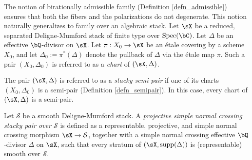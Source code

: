 \documentclass[11pt,letterpaper]{amsart}
\numberwithin{equation}{section}
\begin{document}
    The notion of birationally admissible family (Definition \ref{defn_admissible}) ensures that both the fibers and the polarizations do not degenerate. This notion naturally generalizes to family over an algebraic stack.
    Let $\sX$ be a reduced, separated Deligne-Mumford stack of finite type over ${\rm Spec}(\bC)$. Let $\Delta$ be an effective $\bQ$-divisor on $\sX$. Let $\pi: X_0 \to \sX$ be an \'etale covering by a scheme $X_0$, and let $\Delta_0 := \pi^\ast(\Delta)$ denote the pullback of $\Delta$ via the \'etale map $\pi$. Such a pair $(X_0, \Delta_0)$ is referred to as a \emph{chart} of $(\sX, \Delta)$.
    
    The pair $(\sX, \Delta)$ is referred to as a \emph{stacky semi-pair} if one of its charts $(X_0, \Delta_0)$ is a semi-pair (Definition \ref{defn_semipair}). In this case, every chart of $(\sX, \Delta)$ is a semi-pair.
    
    Let $\mathcal{S}$ be a smooth Deligne-Mumford stack. A \emph{projective simple normal crossing stacky pair over $\mathcal{S}$} is defined as a representable, projective, and simple normal crossing morphism $\sX \to \mathcal{S}$, together with a simple normal crossing effective $\bQ$-divisor $\Delta$ on $\sX$, such that every stratum of $(\sX,{\rm supp}(\Delta))$ is (representable) smooth over $\mathcal{S}$.
    
\end{document}
